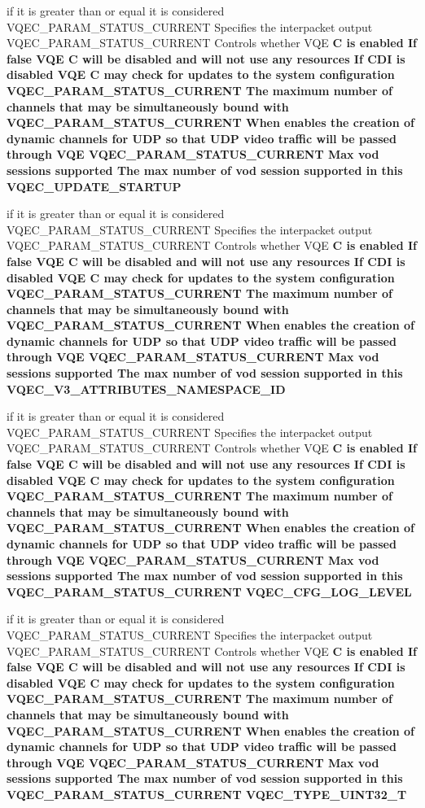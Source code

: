 \begin{CompactItemize}
\item 
if it is greater than or equal it is considered VQEC\_\-PARAM\_\-STATUS\_\-CURRENT Specifies the interpacket output VQEC\_\-PARAM\_\-STATUS\_\-CURRENT Controls whether VQE \bf{C} is enabled If false VQE \bf{C} will be disabled and will not use any resources If CDI is disabled VQE \bf{C} may check for updates \bf{to} the system configuration VQEC\_\-PARAM\_\-STATUS\_\-CURRENT The maximum number of \bf{channels} that may be simultaneously bound with VQEC\_\-PARAM\_\-STATUS\_\-CURRENT When enables the creation of dynamic \bf{channels} for UDP so that UDP video traffic will be passed through VQE VQEC\_\-PARAM\_\-STATUS\_\-CURRENT Max vod sessions supported The max number of vod session supported in \bf{this} \bf{VQEC\_\-UPDATE\_\-STARTUP}
\item 
if it is greater than or equal it is considered VQEC\_\-PARAM\_\-STATUS\_\-CURRENT Specifies the interpacket output VQEC\_\-PARAM\_\-STATUS\_\-CURRENT Controls whether VQE \bf{C} is enabled If false VQE \bf{C} will be disabled and will not use any resources If CDI is disabled VQE \bf{C} may check for updates \bf{to} the system configuration VQEC\_\-PARAM\_\-STATUS\_\-CURRENT The maximum number of \bf{channels} that may be simultaneously bound with VQEC\_\-PARAM\_\-STATUS\_\-CURRENT When enables the creation of dynamic \bf{channels} for UDP so that UDP video traffic will be passed through VQE VQEC\_\-PARAM\_\-STATUS\_\-CURRENT Max vod sessions supported The max number of vod session supported in \bf{this} \bf{VQEC\_\-V3\_\-ATTRIBUTES\_\-NAMESPACE\_\-ID}
\item 
if it is greater than or equal it is considered VQEC\_\-PARAM\_\-STATUS\_\-CURRENT Specifies the interpacket output VQEC\_\-PARAM\_\-STATUS\_\-CURRENT Controls whether VQE \bf{C} is enabled If false VQE \bf{C} will be disabled and will not use any resources If CDI is disabled VQE \bf{C} may check for updates \bf{to} the system configuration VQEC\_\-PARAM\_\-STATUS\_\-CURRENT The maximum number of \bf{channels} that may be simultaneously bound with VQEC\_\-PARAM\_\-STATUS\_\-CURRENT When enables the creation of dynamic \bf{channels} for UDP so that UDP video traffic will be passed through VQE VQEC\_\-PARAM\_\-STATUS\_\-CURRENT Max vod sessions supported The max number of vod session supported in \bf{this} VQEC\_\-PARAM\_\-STATUS\_\-CURRENT \bf{VQEC\_\-CFG\_\-LOG\_\-LEVEL}
\item 
if it is greater than or equal it is considered VQEC\_\-PARAM\_\-STATUS\_\-CURRENT Specifies the interpacket output VQEC\_\-PARAM\_\-STATUS\_\-CURRENT Controls whether VQE \bf{C} is enabled If false VQE \bf{C} will be disabled and will not use any resources If CDI is disabled VQE \bf{C} may check for updates \bf{to} the system configuration VQEC\_\-PARAM\_\-STATUS\_\-CURRENT The maximum number of \bf{channels} that may be simultaneously bound with VQEC\_\-PARAM\_\-STATUS\_\-CURRENT When enables the creation of dynamic \bf{channels} for UDP so that UDP video traffic will be passed through VQE VQEC\_\-PARAM\_\-STATUS\_\-CURRENT Max vod sessions supported The max number of vod session supported in \bf{this} VQEC\_\-PARAM\_\-STATUS\_\-CURRENT \bf{VQEC\_\-TYPE\_\-UINT32\_\-T}

\end{CompactItemize}
